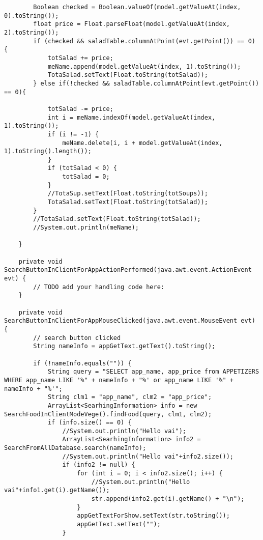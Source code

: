 \documentclass[12pt,a4paper]{article}
\begin{document}
\begin{lstlisting}
        Boolean checked = Boolean.valueOf(model.getValueAt(index, 0).toString());
        float price = Float.parseFloat(model.getValueAt(index, 2).toString());
        if (checked && saladTable.columnAtPoint(evt.getPoint()) == 0) {
            totSalad += price;
            meName.append(model.getValueAt(index, 1).toString());
            TotaSalad.setText(Float.toString(totSalad));
        } else if(!checked && saladTable.columnAtPoint(evt.getPoint()) == 0){
            
            totSalad -= price;
            int i = meName.indexOf(model.getValueAt(index, 1).toString());
            if (i != -1) {
                meName.delete(i, i + model.getValueAt(index, 1).toString().length());
            }
            if (totSalad < 0) {
                totSalad = 0;
            }
            //TotaSup.setText(Float.toString(totSoups));
            TotaSalad.setText(Float.toString(totSalad));
        }
        //TotaSalad.setText(Float.toString(totSalad));
        //System.out.println(meName);

    }                                       

    private void SearchButtonInClientForAppActionPerformed(java.awt.event.ActionEvent evt) {                                                           
        // TODO add your handling code here:
    }                                                          

    private void SearchButtonInClientForAppMouseClicked(java.awt.event.MouseEvent evt) {                                                        
        // search button clicked
        String nameInfo = appGetText.getText().toString();

        if (!nameInfo.equals("")) {
            String query = "SELECT app_name, app_price from APPETIZERS WHERE app_name LIKE '%" + nameInfo + "%' or app_name LIKE '%" + nameInfo + "%'";
            String clm1 = "app_name", clm2 = "app_price";
            ArrayList<SearhingInformation> info = new SearchFoodInClientModeVege().findFood(query, clm1, clm2);
            if (info.size() == 0) {
                //System.out.println("Hello vai");
                ArrayList<SearhingInformation> info2 = SearchFromAllDatabase.search(nameInfo);
                //System.out.println("Hello vai"+info2.size());
                if (info2 != null) {
                    for (int i = 0; i < info2.size(); i++) {
                        //System.out.println("Hello vai"+info1.get(i).getName());
                        str.append(info2.get(i).getName() + "\n");
                    }
                    appGetTextForShow.setText(str.toString());
                    appGetText.setText("");
                }


\end{lstlisting}
\end{document}
